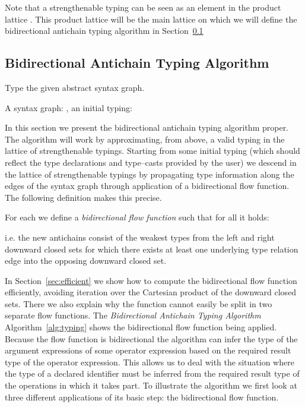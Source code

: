 \documentclass{sigplanconf}
\newcommand{\concept}[1]{\emph{#1}}
\begin{document}
Note that a strengthenable typing  can be seen as an element
in the product lattice . This product lattice will be the
main lattice on which we will define the bidirectional antichain
typing algorithm in Section~\ref{sec:algorithm}

\subsection{Bidirectional Antichain Typing Algorithm}\label{sec:algorithm}

\begin{algorithm}[b]
\caption{Type the given abstract syntax graph.}\label{alg:typing}
\begin{algorithmic}[1]
\REQUIRE A syntax graph: , an
initial typing: 
\STATE 
\WHILE{}
  \STATE 
  \STATE 
\IF{}
\STATE 
\STATE 
\ENDIF
\IF{}
\STATE 
\STATE 
\ENDIF
\STATE 
\ENDWHILE
\end{algorithmic}
\end{algorithm}

In this section we present the bidirectional antichain typing
algorithm proper. The algorithm will work by approximating, from
above, a valid typing in the lattice of strengthenable
typings. Starting from some initial typing (which should reflect the
type declarations and type--casts provided by the user) we descend in
the lattice of strengthenable typings by propagating type information
along the edges of the syntax graph through application of a
bidirectional flow function. The following definition makes this
precise.

\begin{definition}\label{def:flow}
For each  we define a \concept{bidirectional flow
  function}  such that for all
 it holds:

i.e. the new antichains consist of the weakest types from the left and
right downward closed sets for which there exists at least one
underlying type relation edge into the opposing downward closed set.
\end{definition}

In Section~\ref{sec:efficient} we show how to compute the
bidirectional flow function efficiently, avoiding iteration over the
Cartesian product of the downward closed sets. There we also explain
why the function cannot easily be split in two separate flow
functions.
The \concept{Bidirectional Antichain Typing Algorithm}
Algorithm~\ref{alg:typing} shows the bidirectional flow function being
applied.
Because the flow function is bidirectional the algorithm can infer the
type of the argument expressions of some operator expression based on
the required result type of the operator expression. This allows us to
deal with the situation where the type of a declared identifier must
be inferred from the required result type of the operations in which it
takes part.
To illustrate the algorithm we first look at three different
applications of its basic step: the bidirectional flow function.
\end{document}
